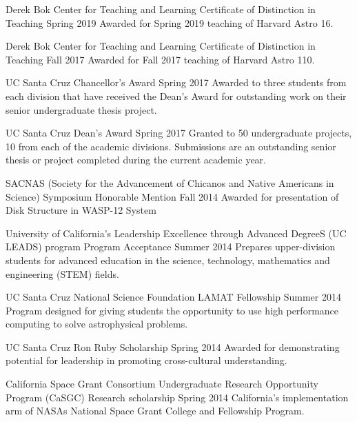 
\begin{cventries}

  \cventry
    {Derek Bok Center for Teaching and Learning} %
    {Certificate of Distinction in Teaching} %
    {Spring 2019} %
    {} %
    {Awarded for Spring 2019 teaching of Harvard Astro 16.}

  \cventry
    {Derek Bok Center for Teaching and Learning} %
    {Certificate of Distinction in Teaching} %
    {Fall 2017} %
    {} %
    {Awarded for Fall 2017 teaching of Harvard Astro 110.}

  \cventry
    {UC Santa Cruz} %
    {Chancellor's Award} %
    {Spring 2017} %
    {} %
    {Awarded to three students from each division that have received the Dean's Award for outstanding work on their senior undergraduate thesis project.}

  \cventry
    {UC Santa Cruz} %
    {Dean's Award} %
    {Spring 2017} %
    {} %
    {Granted to 50 undergraduate projects, 10 from each of the academic divisions. Submissions are an outstanding senior thesis or project completed during the current academic year.}

  \cventry
    {SACNAS (Society for the Advancement of Chicanos and Native Americans in Science)} %
    {Symposium Honorable Mention} %
    {Fall 2014} %
    {} %
    {Awarded for presentation of Disk Structure in WASP-12 System}

  \cventry
    {University of California’s Leadership Excellence through Advanced DegreeS (UC LEADS) program} %
    {Program Acceptance} %
    {Summer 2014} %
    {} %
    {Prepares upper-division students for advanced education in the science, technology, mathematics and engineering (STEM) fields.}

  \cventry
    {UC Santa Cruz} %
    {National Science Foundation LAMAT Fellowship} %
    {Summer 2014} %
    {} %
    {Program designed for giving students the opportunity to use high performance computing to solve astrophysical problems.}
    
  \cventry
    {UC Santa Cruz} %
    {Ron Ruby Scholarship} %
    {Spring 2014} %
    {} %
    {Awarded for demonstrating potential for leadership in promoting cross-cultural understanding.}

  \cventry
    {California Space Grant Consortium Undergraduate Research Opportunity Program (CaSGC)} %
    {Research scholarship} %
    {Spring 2014} %
    {} %
    {California’s implementation arm of NASAs National Space Grant College and Fellowship Program.}


\end{cventries}
